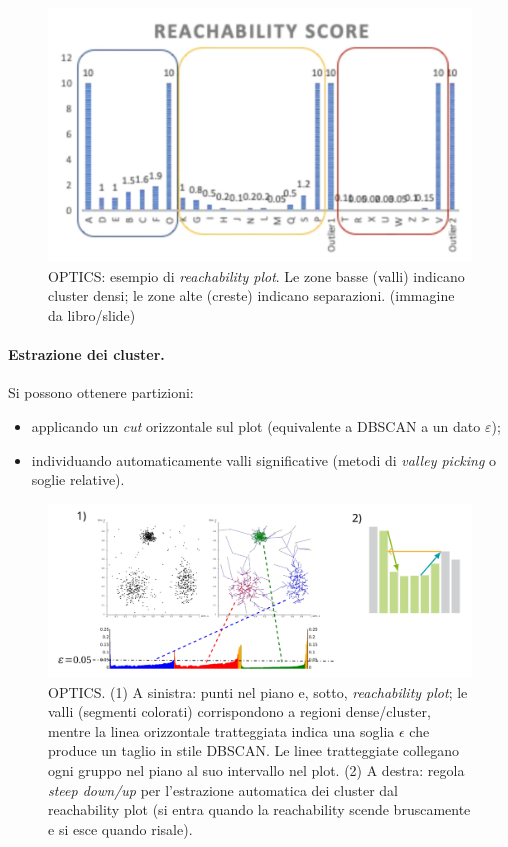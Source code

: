 \begin{figure}[htbp]
  \centering
  \includegraphics[width=.8\textwidth]{images/optics_reachability.png}
  \caption{OPTICS: esempio di \emph{reachability plot}. Le zone basse (valli) indicano cluster densi; le zone alte (creste) indicano separazioni. (immagine da libro/slide)}
  \label{fig:optics-reach}
\end{figure}

\paragraph{Estrazione dei cluster.}
Si possono ottenere partizioni:
\begin{itemize}
  \item applicando un \emph{cut} orizzontale sul plot (equivalente a DBSCAN a un dato $\varepsilon$);
  \item individuando automaticamente valli significative (metodi di \emph{valley picking} o soglie relative).
\end{itemize}

\begin{figure}[htbp]
  \centering
  \includegraphics[width=.8\textwidth]{images/cluster_extraction_optics.png}
  \caption{OPTICS. (1) A sinistra: punti nel piano e, sotto, \emph{reachability plot}; le valli (segmenti colorati) corrispondono a regioni dense/cluster, mentre la linea orizzontale tratteggiata indica una soglia 
  $\epsilon$ che produce un taglio in stile DBSCAN. Le linee tratteggiate collegano ogni gruppo nel piano al suo intervallo nel plot. (2) A destra: regola \emph{steep down/up} per l’estrazione automatica dei cluster dal reachability plot (si entra quando la reachability scende bruscamente e si esce quando risale).}  
  \label{fig:optics-cluster-extraction}
\end{figure}

